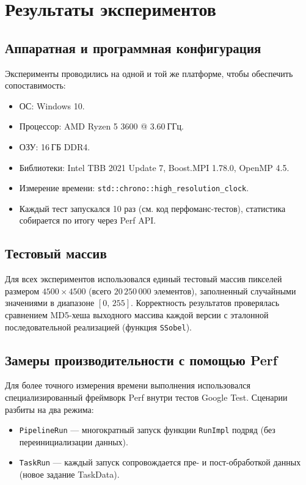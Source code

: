 \documentclass[12pt]{article}
\begin{document}
\section{Результаты экспериментов}

\subsection{Аппаратная и программная конфигурация}

Эксперименты проводились на одной и той же платформе, чтобы обеспечить сопоставимость:
\begin{itemize}
    \item ОС: Windows 10.
    \item Процессор: AMD Ryzen 5 3600 @ 3.60 ГГц.
    \item ОЗУ: 16 ГБ DDR4.
    \item Библиотеки: Intel TBB 2021 Update 7, Boost.MPI 1.78.0, OpenMP 4.5.
    \item Измерение времени: \texttt{std::chrono::high\_resolution\_clock}.
    \item Каждый тест запускался 10 раз (см. код перфоманс-тестов), статистика собирается по итогу через Perf API.
\end{itemize}

\subsection{Тестовый массив}

Для всех экспериментов использовался единый тестовый массив пикселей размером $4500 \times 4500$ (всего $20\,250\,000$ элементов), заполненный случайными значениями в диапазоне $[0,\,255]$. Корректность результатов проверялась сравнением MD5-хеша выходного массива каждой версии с эталонной последовательной реализацией (функция \texttt{SSobel}).

\subsection{Замеры производительности с помощью Perf}

Для более точного измерения времени выполнения использовался специализированный фреймворк Perf внутри тестов Google Test. Сценарии разбиты на два режима:
\begin{itemize}
    \item \lstinline[breaklines]{PipelineRun} — многократный запуск функции \lstinline[breaklines]{RunImpl} подряд (без переинициализации данных).
    \item \lstinline[breaklines]{TaskRun} — каждый запуск сопровождается пре- и пост-обработкой данных (новое задание TaskData).
\end{itemize}
\end{document}
